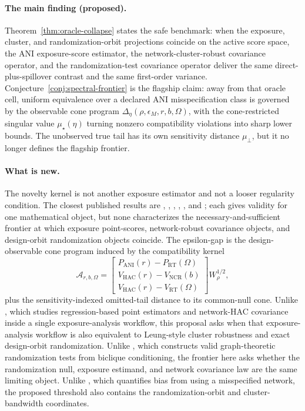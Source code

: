 \documentclass[11pt]{article}
\theoremstyle{definition}
\theoremstyle{plain}
\theoremstyle{remark}
\begin{document}
\paragraph{The main finding (proposed).}
Theorem~\ref{thm:oracle-collapse} states the safe benchmark: when the exposure,
cluster, and randomization-orbit projections coincide on the active score
space, the ANI exposure-score estimator, the network-cluster-robust covariance
operator, and the randomization-test covariance operator deliver the same
direct-plus-spillover contrast and the same first-order variance.
Conjecture~\ref{conj:spectral-frontier} is the flagship claim: away from that
oracle cell, uniform equivalence over a declared ANI misspecification class is
governed by the observable cone program
\(\Delta_\eta(\rho,\epsilon_M,r,b,\Omega)\), with the cone-restricted singular
value \(\mu_\star(\eta)\) turning nonzero compatibility violations into sharp
lower bounds.  The unobserved true tail has its own sensitivity distance
\(\mu_{\perp}\), but it no longer defines the flagship frontier.

\paragraph{What is new.}
The novelty kernel is not another exposure estimator and not a looser
regularity condition.  The closest published results are
\citet{Leung2022ANI}, \citet{Leung2023NCRI},
\citet{BasseDingFellerToulis2024}, \citet{GaoDing2025Network},
\citet{PuelzBasseFellerToulis2022}, and \citet{WeinsteinNevo2026};
each gives validity for one mathematical object, but none characterizes the
necessary-and-sufficient frontier at which exposure point-scores,
network-robust covariance objects, and design-orbit randomization objects
coincide.  The epsilon-gap is the design-observable cone program induced by
the compatibility kernel
\[
  \mathcal A_{r,b,\Omega}
  =
  \begin{bmatrix}
  P_{\mathrm{ANI}}(r)-P_{\mathrm{RT}}(\Omega)\\
  V_{\mathrm{HAC}}(r)-V_{\mathrm{NCR}}(b)\\
  V_{\mathrm{HAC}}(r)-V_{\mathrm{RT}}(\Omega)
  \end{bmatrix} W_\rho^{1/2},
\]
plus the sensitivity-indexed omitted-tail distance to its common-null cone.
Unlike \citet{GaoDing2025Network}, which studies regression-based point
estimators and network-HAC covariance inside a single exposure-analysis
workflow, this proposal asks when that exposure-analysis workflow is also
equivalent to Leung-style cluster robustness and exact design-orbit
randomization.  Unlike \citet{PuelzBasseFellerToulis2022}, which constructs
valid graph-theoretic randomization tests from biclique conditioning, the
frontier here asks whether the randomization null, exposure estimand, and
network covariance law are the same limiting object.  Unlike
\citet{WeinsteinNevo2026}, which quantifies bias from using a misspecified
network, the proposed threshold also contains the randomization-orbit and
cluster-bandwidth coordinates.
\end{document}
